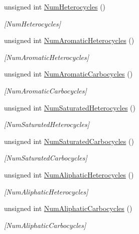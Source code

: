 \begin{DoxyCompactItemize}
unsigned int \mbox{\hyperlink{class_molecule_a9ea5ea968d6b3712d059b33fcd860c94}{Num\+Heterocycles}} ()
\begin{DoxyCompactList}\small\item\em \mbox{[}Num\+Heterocycles\mbox{]} \end{DoxyCompactList}\item 
unsigned int \mbox{\hyperlink{class_molecule_acacbd3d2e5fc65157be32f14ef98f15d}{Num\+Aromatic\+Heterocycles}} ()
\begin{DoxyCompactList}\small\item\em \mbox{[}Num\+Aromatic\+Heterocycles\mbox{]} \end{DoxyCompactList}\item 
unsigned int \mbox{\hyperlink{class_molecule_af0be542ca2e2d7d137d80dc0fdc7d6ec}{Num\+Aromatic\+Carbocycles}} ()
\begin{DoxyCompactList}\small\item\em \mbox{[}Num\+Aromatic\+Carbocycles\mbox{]} \end{DoxyCompactList}\item 
unsigned int \mbox{\hyperlink{class_molecule_a9121b878bee7059c7f3eabb541e3c029}{Num\+Saturated\+Heterocycles}} ()
\begin{DoxyCompactList}\small\item\em \mbox{[}Num\+Saturated\+Heterocycles\mbox{]} \end{DoxyCompactList}\item 
unsigned int \mbox{\hyperlink{class_molecule_a63f6f6403e648006f25feb9103add3ce}{Num\+Saturated\+Carbocycles}} ()
\begin{DoxyCompactList}\small\item\em \mbox{[}Num\+Saturated\+Carbocycles\mbox{]} \end{DoxyCompactList}\item 
unsigned int \mbox{\hyperlink{class_molecule_a9c5af0a753b98601782bb2d98021793a}{Num\+Aliphatic\+Heterocycles}} ()
\begin{DoxyCompactList}\small\item\em \mbox{[}Num\+Aliphatic\+Heterocycles\mbox{]} \end{DoxyCompactList}\item 
unsigned int \mbox{\hyperlink{class_molecule_a4953b86e7456967bb605bdb61c15b1aa}{Num\+Aliphatic\+Carbocycles}} ()
\begin{DoxyCompactList}\small\item\em \mbox{[}Num\+Aliphatic\+Carbocycles\mbox{]} \end{DoxyCompactList}\item 

\end{DoxyCompactItemize}

